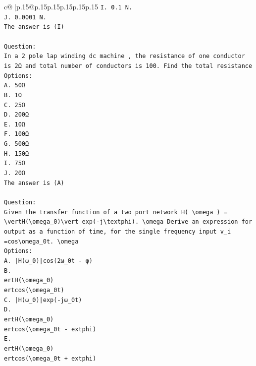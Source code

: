 \documentclass{article}
\begin{document}
{\begin{supertabular}{c@{$\;$}|p{.15\linewidth}@{}p{.15\linewidth}p{.15\linewidth}p{.15\linewidth}p{.15\linewidth}p{.15\linewidth}}
{{{\texttt{I. 0.1 N.} \\
\texttt{J. 0.0001 N.} \\
\texttt{The answer is (I)} \\
\\ 
\texttt{Question:} \\
\texttt{In a 2 pole lap winding dc machine , the resistance of one conductor is 2Ω and total number of conductors is 100. Find the total resistance} \\
\texttt{Options:} \\
\texttt{A. 50Ω} \\
\texttt{B. 1Ω} \\
\texttt{C. 25Ω} \\
\texttt{D. 200Ω} \\
\texttt{E. 10Ω} \\
\texttt{F. 100Ω} \\
\texttt{G. 500Ω} \\
\texttt{H. 150Ω} \\
\texttt{I. 75Ω} \\
\texttt{J. 20Ω} \\
\texttt{The answer is (A)} \\
\\ 
\texttt{Question:} \\
\texttt{Given the transfer function of a two port network H( \textbackslash{}omega ) = \textbackslash{}vertH(\textbackslash{}omega\_0)\textbackslash{}vert exp({-}j\textbackslash{}textphi). \textbackslash{}omega Derive an expression for output as a function of time, for the single frequency input v\_i =cos\textbackslash{}omega\_0t. \textbackslash{}omega} \\
\texttt{Options:} \\
\texttt{A. |H(ω\_0)|cos(2ω\_0t {-} φ)} \\
\texttt{B. } \\
\texttt{ertH(\textbackslash{}omega\_0)} \\
\texttt{ertcos(\textbackslash{}omega\_0t)} \\
\texttt{C. |H(ω\_0)|exp({-}jω\_0t)} \\
\texttt{D. } \\
\texttt{ertH(\textbackslash{}omega\_0)} \\
\texttt{ertcos(\textbackslash{}omega\_0t {-} 	extphi)} \\
\texttt{E. } \\
\texttt{ertH(\textbackslash{}omega\_0)} \\
\texttt{ertcos(\textbackslash{}omega\_0t + 	extphi)} \\
}}}
\end{supertabular}}
\end{document}
